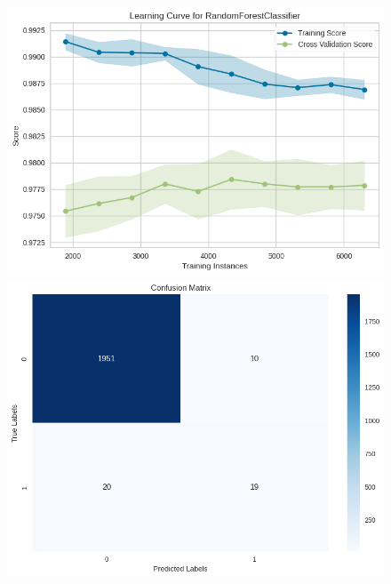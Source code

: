 \documentclass[
  oneclumn]{article}
\begin{document}
\begin{figure}
\begin{minipage}{0.50\linewidth}
\includegraphics{rf_learn.png}

\end{minipage}%
\newline
\begin{minipage}{0.50\linewidth}

\includegraphics{mc_dt.png}

\end{minipage}%
%
\begin{minipage}{0.50\linewidth}


\end{minipage}
\end{figure}
\end{document}
